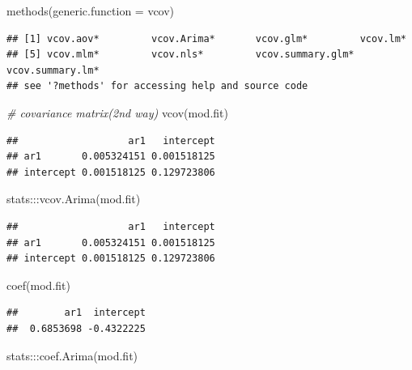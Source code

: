 \documentclass[
]{book}
\newenvironment{Shaded}{\begin{snugshade}}{\end{snugshade}}
\newcommand{\AttributeTok}[1]{\textcolor[rgb]{0.77,0.63,0.00}{#1}}
\newcommand{\CommentTok}[1]{\textcolor[rgb]{0.56,0.35,0.01}{\textit{#1}}}
\newcommand{\FunctionTok}[1]{\textcolor[rgb]{0.00,0.00,0.00}{#1}}
\newcommand{\NormalTok}[1]{#1}
\newcommand{\SpecialCharTok}[1]{\textcolor[rgb]{0.00,0.00,0.00}{#1}}
\theoremstyle{definition}
\theoremstyle{definition}
\theoremstyle{definition}
\theoremstyle{definition}
\theoremstyle{remark}
\begin{document}
\begin{Shaded}
\begin{Highlighting}[]
\FunctionTok{methods}\NormalTok{(}\AttributeTok{generic.function =}\NormalTok{ vcov)}
\end{Highlighting}
\end{Shaded}

\begin{verbatim}
## [1] vcov.aov*         vcov.Arima*       vcov.glm*         vcov.lm*         
## [5] vcov.mlm*         vcov.nls*         vcov.summary.glm* vcov.summary.lm* 
## see '?methods' for accessing help and source code
\end{verbatim}

\begin{Shaded}
\begin{Highlighting}[]
\CommentTok{\# covariance matrix(2nd way)}
\FunctionTok{vcov}\NormalTok{(mod.fit)}
\end{Highlighting}
\end{Shaded}

\begin{verbatim}
##                   ar1   intercept
## ar1       0.005324151 0.001518125
## intercept 0.001518125 0.129723806
\end{verbatim}

\begin{Shaded}
\begin{Highlighting}[]
\NormalTok{stats}\SpecialCharTok{:::}\FunctionTok{vcov.Arima}\NormalTok{(mod.fit)}
\end{Highlighting}
\end{Shaded}

\begin{verbatim}
##                   ar1   intercept
## ar1       0.005324151 0.001518125
## intercept 0.001518125 0.129723806
\end{verbatim}

\begin{Shaded}
\begin{Highlighting}[]
\FunctionTok{coef}\NormalTok{(mod.fit)}
\end{Highlighting}
\end{Shaded}

\begin{verbatim}
##        ar1  intercept 
##  0.6853698 -0.4322225
\end{verbatim}

\begin{Shaded}
\begin{Highlighting}[]
\NormalTok{stats}\SpecialCharTok{:::}\FunctionTok{coef.Arima}\NormalTok{(mod.fit)}
\end{Highlighting}
\end{Shaded}
\end{document}
